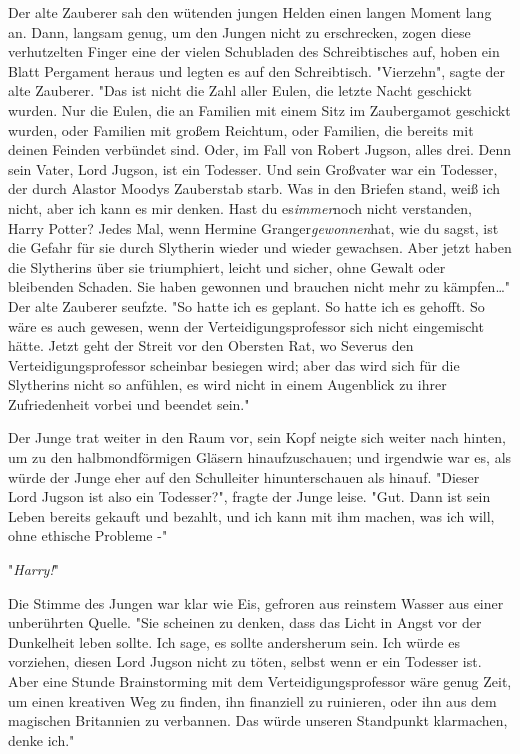 {Der alte Zauberer sah den wütenden jungen Helden einen langen Moment lang an. Dann, langsam genug, um den Jungen nicht zu erschrecken, zogen diese verhutzelten Finger eine der vielen Schubladen des Schreibtisches auf, hoben ein Blatt Pergament heraus und legten es auf den Schreibtisch. "Vierzehn", sagte der alte Zauberer. "Das ist nicht die Zahl aller Eulen, die letzte Nacht geschickt wurden. Nur die Eulen, die an Familien mit einem Sitz im Zaubergamot geschickt wurden, oder Familien mit großem Reichtum, oder Familien, die bereits mit deinen Feinden verbündet sind. Oder, im Fall von Robert Jugson, alles drei. Denn sein Vater, Lord Jugson, ist ein Todesser. Und sein Großvater war ein Todesser, der durch Alastor Moodys Zauberstab starb. Was in den Briefen stand, weiß ich nicht, aber ich kann es mir denken. Hast du es\emph{immer}noch nicht verstanden, Harry Potter? Jedes Mal, wenn Hermine Granger\emph{gewonnen}hat, wie du sagst, ist die Gefahr für sie durch Slytherin wieder und wieder gewachsen. Aber jetzt haben die Slytherins über sie triumphiert, leicht und sicher, ohne Gewalt oder bleibenden Schaden. Sie haben gewonnen und brauchen nicht mehr zu kämpfen…" Der alte Zauberer seufzte. "So hatte ich es geplant. So hatte ich es gehofft. So wäre es auch gewesen, wenn der Verteidigungsprofessor sich nicht eingemischt hätte. Jetzt geht der Streit vor den Obersten Rat, wo Severus den Verteidigungsprofessor scheinbar besiegen wird; aber das wird sich für die Slytherins nicht so anfühlen, es wird nicht in einem Augenblick zu ihrer Zufriedenheit vorbei und beendet sein."

Der Junge trat weiter in den Raum vor, sein Kopf neigte sich weiter nach hinten, um zu den halbmondförmigen Gläsern hinaufzuschauen; und irgendwie war es, als würde der Junge eher auf den Schulleiter hinunterschauen als hinauf. "Dieser Lord Jugson ist also ein Todesser?", fragte der Junge leise. "Gut. Dann ist sein Leben bereits gekauft und bezahlt, und ich kann mit ihm machen, was ich will, ohne ethische Probleme -"

"\emph{Harry!}"

Die Stimme des Jungen war klar wie Eis, gefroren aus reinstem Wasser aus einer unberührten Quelle. "Sie scheinen zu denken, dass das Licht in Angst vor der Dunkelheit leben sollte. Ich sage, es sollte andersherum sein. Ich würde es vorziehen, diesen Lord Jugson nicht zu töten, selbst wenn er ein Todesser ist. Aber eine Stunde Brainstorming mit dem Verteidigungsprofessor wäre genug Zeit, um einen kreativen Weg zu finden, ihn finanziell zu ruinieren, oder ihn aus dem magischen Britannien zu verbannen. Das würde unseren Standpunkt klarmachen, denke ich."

}
